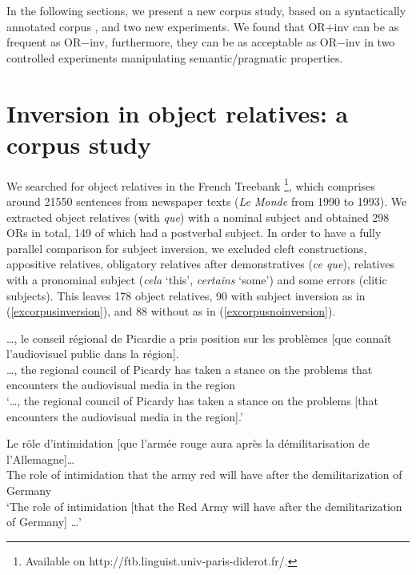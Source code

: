 \documentclass[output=paper]{langscibook}
\begin{document}
In the following sections, we present a new corpus study, based on a
syntactically annotated corpus \citep [the French
Treebank,][]{abeille2019corpus}, and two new experiments. We found
that OR$+$inv can be as frequent as OR$-$inv, furthermore, they can be
as acceptable as OR$-$inv in two controlled experiments manipulating
semantic/pragmatic properties.


\section{Inversion in object relatives: a corpus study} 


We searched for object relatives in the French Treebank \citep{abeille2019corpus}\footnote{Available on http://ftb.linguist.univ-paris-diderot.fr/. }, which comprises around 21550 sentences from newspaper texts (\textit{Le Monde} from 1990 to 1993). We extracted object relatives (with \textit{que}) with a nominal subject and obtained 298 ORs in total, 149 of which had a postverbal subject. In order to have a fully parallel comparison for subject inversion, we excluded cleft constructions, appositive relatives, obligatory relatives after demonstratives (\textit{ce que}), relatives with a pronominal subject (\textit{cela} ‘this’, \textit{certains} ‘some’) and some errors (clitic subjects). This leaves 178 object relatives, 90 with subject inversion as in (\ref{excorpusinversion}), and 88 without as in (\ref{excorpusnoinversion}). 

\begin{exe}
\ex \label{excorpusinversion}

\gll …, le conseil régional de Picardie a pris position sur les problèmes [que connaît {l’audiovisuel public} dans la région]. 
 \\    
…, the regional council  of Picardy has taken {a stance} on the problems that encounters {the audiovisual media} in the region \\
\glt `…, the regional council  of Picardy has taken a stance on the problems [that encounters the audiovisual media in the region].'


\ex \label{excorpusnoinversion}
\gll Le rôle d'intimidation [que l'armée rouge aura après la démilitarisation de l'Allemagne]… 
\\    
The role {of intimidation} that {the army} red {will have} after the demilitarization of Germany \\
\glt `The role of intimidation [that the Red Army will have after the demilitarization of Germany] …'

\end{exe}
\end{document}
